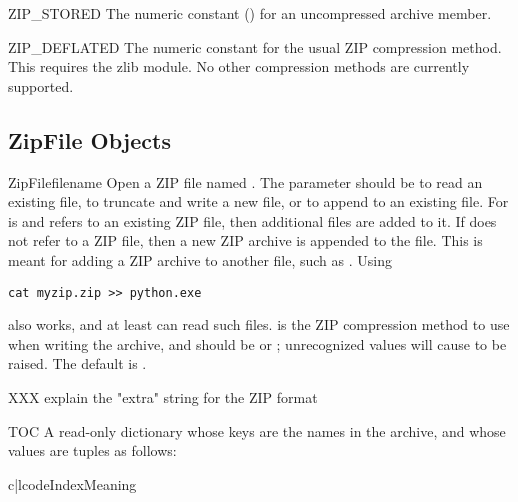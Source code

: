 \begin{datadesc}{ZIP_STORED}
  The numeric constant () for an uncompressed archive member.
\end{datadesc}

\begin{datadesc}{ZIP_DEFLATED}
  The numeric constant for the usual ZIP compression method.  This
  requires the zlib module.  No other compression methods are
  currently supported.
\end{datadesc}


\begin{seealso}
\end{seealso}


\subsection{ZipFile Objects \label{zipfile-objects}}

\begin{classdesc}{ZipFile}{filename} 
  Open a ZIP file named .  The  parameter
  should be  to read an existing file,  to
  truncate and write a new file, or  to append to an
  existing file.  For  is  and 
  refers to an existing ZIP file, then additional files are added to
  it.  If  does not refer to a ZIP file, then a new ZIP
  archive is appended to the file.  This is meant for adding a ZIP
  archive to another file, such as .  Using
\begin{verbatim}
cat myzip.zip >> python.exe
\end{verbatim}
  also works, and at least  can read such files.
   is the ZIP compression method to use when writing
  the archive, and should be  or
  ; unrecognized values will cause
   to be raised.  The default is
  . 
\end{classdesc}

XXX explain the "extra" string for the ZIP format

\begin{memberdesc}{TOC}
  A read-only dictionary whose keys are the names in the archive, and
  whose values are tuples as follows:

\begin{tableii}{c|l}{code}{Index}{Meaning}
\end{tableii}
\end{memberdesc}


